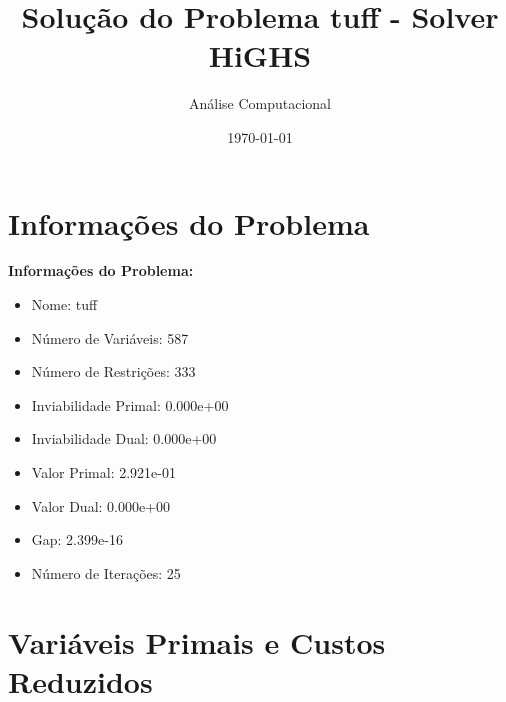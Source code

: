\documentclass[12pt]{article}
\title{Solução do Problema tuff - Solver HiGHS}
\author{Análise Computacional}
\date{\today}
\begin{document}
\maketitle

\section{Informações do Problema}

\textbf{Informações do Problema:}
\begin{itemize}
\item Nome: tuff
\item Número de Variáveis: 587
\item Número de Restrições: 333
\item Inviabilidade Primal: 0.000e+00
\item Inviabilidade Dual: 0.000e+00
\item Valor Primal: 2.921e-01
\item Valor Dual: 0.000e+00
\item Gap: 2.399e-16
\item Número de Iterações: 25
\end{itemize}


\section{Variáveis Primais e Custos Reduzidos}
\end{document}
